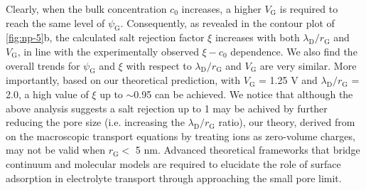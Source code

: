 %
Clearly, when the bulk concentration $c_{0}$ increases, a higher
$V_{\mathrm{G}}$ is required to reach the same level of
$\psi_{\mathrm{G}}$. Consequently, as revealed in the contour plot of
\autoref{fig:np-5}b, the calculated salt rejection factor $\xi$
increases with both $\lambda_{\mathrm{D}} / r_{\mathrm{G}}$ and
$V_{\mathrm{G}}$, in line with the experimentally observed
$\xi - c_{0}$ dependence. We also find the overall trends for
$\psi_{\mathrm{G}}$ and $\xi$ with respect to
$\lambda_{\mathrm{D}}/r_{\mathrm{G}}$ and $V_{\mathrm{G}}$ are very
similar. More importantly, based on our theoretical prediction, with
$V_{\mathrm{G}}$ = 1.25 V and $\lambda_{\mathrm{D}} / r_{\mathrm{G}}$
= { 2.0}, a high value of $\xi$ up to $\sim$0.95 can be achieved.  We
notice that although the above analysis suggests a salt rejection up
to 1 may be achived by further reducing the pore size (i.e. increasing
the $\lambda_{\mathrm{D}}/r_{\mathrm{G}}$ ratio), our theory, derived
from on the macroscopic transport equations by treating ions as
zero-volume charges, may not be valid when $r_{\mathrm{G}}<$ 5
nm\cite{Jain_2015_subcontin_ion}.  Advanced theoretical frameworks
that bridge continuum and molecular models are required to elucidate
the role of surface adsorption in electrolyte transport through
approaching the small pore limit.




